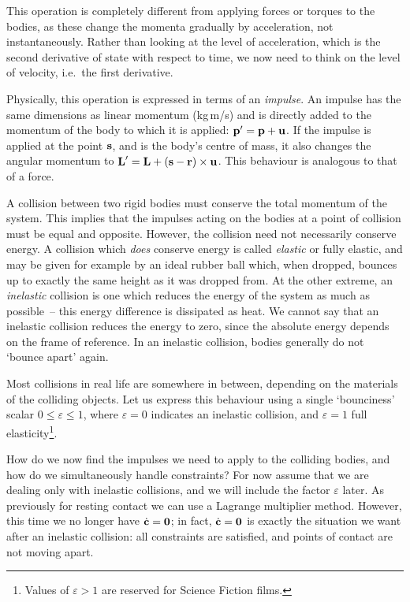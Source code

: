This operation is completely different from applying forces or torques to the bodies, as these
change the momenta gradually by acceleration, not instantaneously. Rather than looking at the
level of acceleration, which is the second derivative of state with respect to time, we now need
to think on the level of velocity, i.e.\ the first derivative.

Physically, this operation is expressed in terms of an \emph{impulse}. An impulse  has the
same dimensions as linear momentum  (kg\,m/s) and is directly added to the momentum of the
body to which it is applied: $\ve{p}' = \ve{p} + \ve{u}$. If the impulse is applied at the point
$\ve{s}$, and  is the body's centre of mass, it also changes the angular momentum to
$\ve{L}' = \ve{L} + (\ve{s} - \ve{r})\times\ve{u}$. This behaviour is analogous to that of a
force.

A collision between two rigid bodies must conserve the total momentum of the system. This implies
that the impulses acting on the bodies at a point of collision must be equal and opposite. However,
the collision need not necessarily conserve energy. A collision which \emph{does} conserve energy
is called \emph{elastic} or fully elastic, and may be given for example by an ideal rubber ball
which, when dropped, bounces up to exactly the same height as it was dropped from. At the other
extreme, an \emph{inelastic} collision is one which reduces the energy of the system as much as
possible~-- this energy difference is dissipated as heat. We cannot say that an inelastic
collision reduces the energy to zero, since the absolute energy depends on the frame of reference.
In an inelastic collision, bodies generally do not `bounce apart' again.

Most collisions in real life are somewhere in between, depending on the materials of the colliding
objects. Let us express this behaviour using a single `bounciness' scalar
$0 \le \varepsilon \le 1$, where $\varepsilon = 0$ indicates an inelastic collision, and
$\varepsilon = 1$ full elasticity\footnote{Values of $\varepsilon > 1$ are reserved for Science
Fiction films.}.

How do we now find the impulses we need to apply to the colliding bodies, and how do we
simultaneously handle constraints? For now assume that we are dealing only with inelastic
collisions, and we will include the factor $\varepsilon$ later. As previously for resting
contact we can use a Lagrange multiplier method. However, this time we no longer have
$\dot{\ve{c}} = \ve{0}$; in fact, $\dot{\ve{c}} = \ve{0}$ is exactly the situation we want after
an inelastic collision: all constraints are satisfied, and points of contact are not moving apart.

